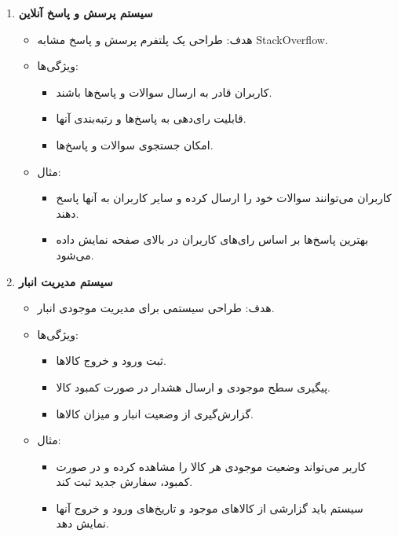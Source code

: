 \documentclass[a4paper,12pt]{article}
\begin{document}
\begin{enumerate}
			\item \textbf{سیستم پرسش و پاسخ آنلاین}
			\begin{itemize}
				\item هدف: طراحی یک پلتفرم پرسش و پاسخ مشابه StackOverflow.
				\item ویژگی‌ها:
				\begin{itemize}
					\item کاربران قادر به ارسال سوالات و پاسخ‌ها باشند.
					\item قابلیت رای‌دهی به پاسخ‌ها و رتبه‌بندی آنها.
					\item امکان جستجوی سوالات و پاسخ‌ها.
				\end{itemize}
				\item مثال:
				\begin{itemize}
					\item کاربران می‌توانند سوالات خود را ارسال کرده و سایر کاربران به آنها پاسخ دهند.
					\item بهترین پاسخ‌ها بر اساس رای‌های کاربران در بالای صفحه نمایش داده می‌شود.
				\end{itemize}
			\end{itemize}
			
			\item \textbf{سیستم مدیریت انبار}
			\begin{itemize}
				\item هدف: طراحی سیستمی برای مدیریت موجودی انبار.
				\item ویژگی‌ها:
				\begin{itemize}
					\item ثبت ورود و خروج کالاها.
					\item پیگیری سطح موجودی و ارسال هشدار در صورت کمبود کالا.
					\item گزارش‌گیری از وضعیت انبار و میزان کالاها.
				\end{itemize}
				\item مثال:
				\begin{itemize}
					\item کاربر می‌تواند وضعیت موجودی هر کالا را مشاهده کرده و در صورت کمبود، سفارش جدید ثبت کند.
					\item سیستم باید گزارشی از کالاهای موجود و تاریخ‌های ورود و خروج آنها نمایش دهد.
				\end{itemize}
			\end{itemize}
			

\end{enumerate}
\end{document}
